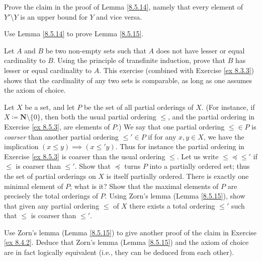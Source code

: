 \begin{exercise}\label{ex 8.5.13}
    Prove the claim in the proof of Lemma \ref{8.5.14}, namely that every element of \(Y' \setminus Y\) is an upper bound for \(Y\) and vice versa.
\end{exercise}

\begin{exercise}\label{ex 8.5.14}
    Use Lemma \ref{8.5.14} to prove Lemma \ref{8.5.15}.
\end{exercise}

\begin{exercise}\label{ex 8.5.15}
    Let \(A\) and \(B\) be two non-empty sets such that \(A\) does not have lesser or equal cardinality to \(B\).
    Using the principle of transfinite induction, prove that \(B\) has lesser or equal cardinality to \(A\).
    This exercise (combined with Exercise \ref{ex 8.3.3}) shows that the cardinality of any two sets is comparable, as long as one assumes the axiom of choice.
\end{exercise}

\begin{exercise}\label{ex 8.5.16}
    Let \(X\) be a set, and let \(P\) be the set of all partial orderings of \(X\).
    (For instance, if \(X \coloneqq \mathbf{N} \setminus \{0\}\), then both the usual partial ordering \(\leq\), and the partial ordering in Exercise \ref{ex 8.5.3}, are elements of \(P\).)
    We say that one partial ordering \(\leq \in P\) is \emph{coarser} than another partial ordering \(\leq' \in P\) if for any \(x, y \in X\), we have the implication \((x \leq y) \implies (x \leq' y)\).
    Thus for instance the partial ordering in Exercise \ref{ex 8.5.3} is coarser than the usual ordering \(\leq\).
    Let us write \(\leq \preceq \leq'\) if \(\leq\) is coarser than \(\leq'\).
    Show that \(\preceq\) turns \(P\) into a partially ordered set;
    thus the set of partial orderings on \(X\) is itself partially ordered.
    There is exactly one minimal element of \(P\);
    what is it?
    Show that the maximal elements of \(P\) are precisely the total orderings of \(P\).
    Using Zorn's lemma (Lemma \ref{8.5.15}), show that given any partial ordering \(\leq\) of \(X\) there exists a total ordering \(\leq'\) such that \(\leq\) is coarser than \(\leq'\).
\end{exercise}

\begin{exercise}\label{ex 8.5.17}
    Use Zorn's lemma (Lemma \ref{8.5.15}) to give another proof of the claim in Exercise \ref{ex 8.4.2}.
    Deduce that Zorn's lemma (Lemma \ref{8.5.15}) and the axiom of choice are in fact logically equivalent
    (i.e., they can be deduced from each other).
\end{exercise}

